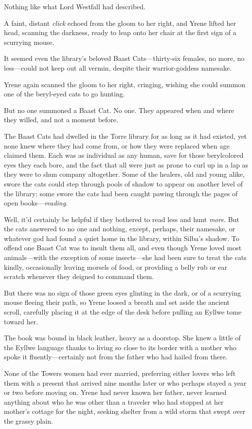 Nothing like what Lord Westfall had described.

A faint, distant \emph{click} echoed from the gloom to her right, and Yrene lifted her head, scanning the darkness, ready to leap onto her chair at the first sign of a scurrying mouse.

It seemed even the library's beloved Baast Cats---thirty-six females, no more, no less---could not keep out all vermin, despite their warrior-goddess namesake.

Yrene again scanned the gloom to her right, cringing, wishing she could summon one of the beryl-eyed cats to go hunting.

But no one summoned a Baast Cat. No one. They appeared when and where they willed, and not a moment before.

The Baast Cats had dwelled in the Torre library for as long as it had existed, yet none knew where they had come from, or how they were replaced when age claimed them. Each was as individual as any human, save for those berylcolored eyes they each bore, and the fact that all were just as prone to curl up in a lap as they were to shun company altogether. Some of the healers, old and young alike, swore the cats could step through pools of shadow to appear on another level of the library; some swore the cats had been caught pawing through the pages of open books---\emph{reading}.

Well, it'd certainly be helpful if they bothered to read less and hunt
\emph{more}. But the cats answered to no one and nothing, except, perhaps, their namesake, or whatever god had found a quiet home in the library, within Silba's shadow. To offend one Baast Cat was to insult them all, and even though Yrene loved most animals---with the exception of some insects---she had been sure to treat the cats kindly, occasionally leaving morsels of food, or providing a belly rub or ear scratch whenever they deigned to command them.

But there was no sign of those green eyes glinting in the dark, or of a scurrying mouse fleeing their path, so Yrene loosed a breath and set aside the ancient scroll, carefully placing it at the edge of the desk before pulling an Eyllwe tome toward her.

The book was bound in black leather, heavy as a doorstop. She knew a little of the Eyllwe language thanks to living so close to its border with a mother who spoke it fluently---certainly not from the father who had hailed from there.

None of the Towers women had ever married, preferring either lovers who left them with a present that arrived nine months later or who perhaps stayed a year or two before moving on. Yrene had never known her father, never learned anything about who he was other than a traveler who had stopped at her mother's cottage for the night, seeking shelter from a wild storm that swept over the grassy plain.

